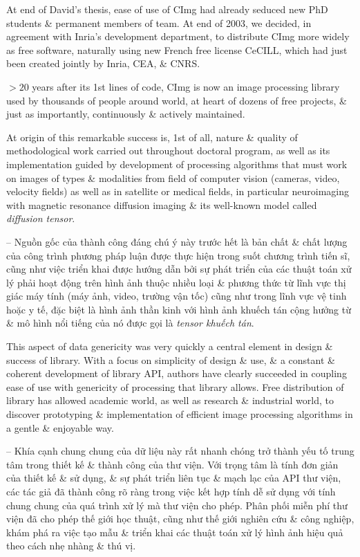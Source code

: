 \documentclass{article}
\begin{document}
\begin{itemize}
    At end of {\sc David}'s thesis, ease of use of CImg had already seduced new PhD students \& permanent members of team. At end of 2003, we decided, in agreement with Inria's development department, to distribute CImg more widely as free software, naturally using new French free license CeCILL, which had just been created jointly by Inria, CEA, \& CNRS.
    
    $> 20$ years after its 1st lines of code, CImg is now an image processing library used by thousands of people around world, at heart of dozens of free projects, \& just as importantly, continuously \& actively maintained.
    
    At origin of this remarkable success is, 1st of all, nature \& quality of methodological work carried out throughout doctoral program, as well as its implementation guided by development of processing algorithms that must work on images of types \& modalities from field of computer vision (cameras, video, velocity fields) as well as in satellite or medical fields, in particular neuroimaging with magnetic resonance diffusion imaging \& its well-known model called {\it diffusion tensor}.
    
    -- Nguồn gốc của thành công đáng chú ý này trước hết là bản chất \& chất lượng của công trình phương pháp luận được thực hiện trong suốt chương trình tiến sĩ, cũng như việc triển khai được hướng dẫn bởi sự phát triển của các thuật toán xử lý phải hoạt động trên hình ảnh thuộc nhiều loại \& phương thức từ lĩnh vực thị giác máy tính (máy ảnh, video, trường vận tốc) cũng như trong lĩnh vực vệ tinh hoặc y tế, đặc biệt là hình ảnh thần kinh với hình ảnh khuếch tán cộng hưởng từ \& mô hình nổi tiếng của nó được gọi là {\it tensor khuếch tán}.
    
    This aspect of data genericity was very quickly a central element in design \& success of library. With a focus on simplicity of design \& use, \& a constant \& coherent development of library API, authors have clearly succeeded in coupling ease of use with genericity of processing that library allows. Free distribution of library has allowed academic world, as well as research \& industrial world, to discover prototyping \& implementation of efficient image processing algorithms in a gentle \& enjoyable way.
    
    -- Khía cạnh chung chung của dữ liệu này rất nhanh chóng trở thành yếu tố trung tâm trong thiết kế \& thành công của thư viện. Với trọng tâm là tính đơn giản của thiết kế \& sử dụng, \& sự phát triển liên tục \& mạch lạc của API thư viện, các tác giả đã thành công rõ ràng trong việc kết hợp tính dễ sử dụng với tính chung chung của quá trình xử lý mà thư viện cho phép. Phân phối miễn phí thư viện đã cho phép thế giới học thuật, cũng như thế giới nghiên cứu \& công nghiệp, khám phá ra việc tạo mẫu \& triển khai các thuật toán xử lý hình ảnh hiệu quả theo cách nhẹ nhàng \& thú vị.
    

\end{itemize}
\end{document}
